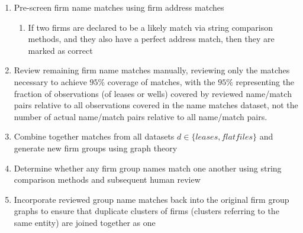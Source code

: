 \documentclass{article}
\begin{document}
\begin{enumerate}
    \item Pre-screen firm name matches using firm address matches
    \begin{enumerate}
    \item If two firms are declared to be a likely match via string comparison methods, and they also have a perfect address match, then they are marked as correct
    \end{enumerate}
    
    \item Review remaining firm name matches manually, reviewing only the matches necessary to achieve $95\%$ coverage of matches, with the $95\%$ representing the fraction of observations (of leases or wells) covered by reviewed name/match pairs relative to all observations covered in the name matches dataset, not the number of actual name/match pairs relative to all name/match pairs.
    
    \item Combine together matches from all datasets $d \in \{leases, flatfiles\}$ and generate new firm groups using graph theory
    
    \item Determine whether any firm group names match one another using string comparison methods and subsequent human review
    
    \item Incorporate reviewed group name matches back into the original firm group graphs to ensure that duplicate clusters of firms (clusters referring to the same entity) are joined together as one 
\end{enumerate}
\end{document}
